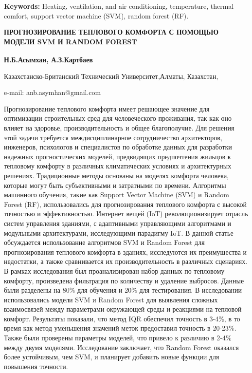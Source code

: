 {\bfseries Keywords:} Heating, ventilation, and air conditioning,
temperature, thermal comfort, support vector machine (SVM), random
forest (RF).

\begin{articleheader}
{\bfseries ПРОГНОЗИРОВАНИЕ ТЕПЛОВОГО КОМФОРТА С ПОМОЩЬЮ МОДЕЛИ SVM И RANDOM
FOREST}
\end{articleheader}

\begin{affiliation}
{\bfseries Н.Б.Асымхан\textsuperscript{\envelope }, А.З.Картбаев}

Казахстанско-Британский Технический Университет,Алматы, Казахстан,

e-mail: anb.asymhan@gmail.com
\end{affiliation}

Прогнозирование теплового комфорта имеет решающее значение для
оптимизации строительных сред для человеческого проживания, так как оно
влияет на здоровье, производительность и общее благополучие. Для решения
этой задачи требуется междисциплинарное сотрудничество архитекторов,
инженеров, психологов и специалистов по обработке данных для разработки
надежных прогностических моделей, предвидящих предпочтения жильцов к
тепловому комфорту в различных климатических условиях и архитектурных
решениях. Традиционные методы основаны на моделях комфорта человека,
которые могут быть субъективными и затратными по времени. Алгоритмы
машинного обучения, такие как Support Vector Machine (SVM) и Random
Forest (RF), использовались для прогнозирования теплового комфорта с
высокой точностью и эффективностью. Интернет вещей (IoT)
революционизирует отрасль систем управления зданиями, с адаптивными
управляющими алгоритмами и модульными архитектурами, исследующими
парадигму IoT. В данной статье обсуждается использование алгоритмов SVM
и Random Forest для прогнозирования теплового комфорта в зданиях,
исследуются их преимущества и недостатки, а также сравнивается их
производительность в различных сценариях. В рамках исследования был
проанализирован набор данных по тепловому комфорту, произведена
фильтрация по количеству и удаление выбросов. Данные были разделены на
80\% для обучения и 20\% для тестирования. В исследовании использовались
модели SVM и Random Forest для выявления сложных взаимосвязей между
параметрами окружающей среды и реакциями на тепловой комфорт. Результаты
показали, что метод IQR обеспечил точность в 3-4\%, в то время как метод
уменьшения значений меток предоставил точность в 20-23\%. Также были
проверены параметры моделей, что привело к различию в 2-4\% между двумя
моделями. Исследование заключает, что Random Forest оказался более
устойчивым, чем SVM, и планирует добавить новые функции для повышения
точности.

